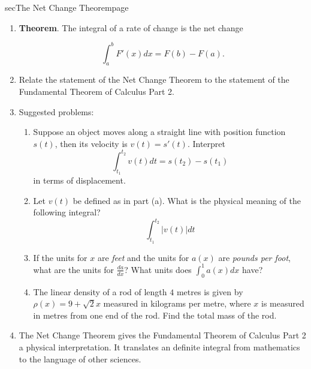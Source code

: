 \documentclass[../main]{subfiles}
\begin{document}
\begin{outline}{sec}{The Net Change Theorem}{page} \label{outline:net_change}
  \begin{enumerate}
    \item \textbf{Theorem}. The integral of a rate of change is the net change
      \begin{mdframed}[style=simple]
        \[ \int_{a}^{b} F'(x) dx = F(b) - F(a). \]
      \end{mdframed}
      
    \item Relate the statement of the Net Change Theorem to the statement of the Fundamental Theorem of Calculus Part 2.
    \item Suggested problems: 
      \begin{enumerate}
        \item Suppose an object moves along a straight line with position function \(s(t)\), then its velocity is \(v(t) = s'(t)\). Interpret 
          \[
            \int_{t_{1}}^{t_{2}} v(t) dt = s(t_{2}) - s(t_{1})
          \]
          in terms of displacement. %

        \item Let \(v(t)\) be defined as in part (a). What is the physical meaning of the following integral?
          \[
            \int_{t_{1}}^{t_{2}} |v(t)| dt
          \]
        \item If the units for \(x\) are \textit{feet} and the units for \(a(x)\) are \textit{pounds per foot}, what are the units for \(\frac{da}{dx}\)? What units does \(\int_{0}^{1} a(x) dx\) have? %
        \item The linear density of a rod of length \(4\) metres is given by \(\rho(x) = 9 + \sqrt{2}x\) measured in kilograms per metre, where \(x\) is measured in metres from one end of the rod. Find the total mass of the rod. %
      \end{enumerate}
      
    \item {The Net Change Theorem gives the Fundamental Theorem of Calculus Part 2 a physical interpretation. It translates an definite integral from mathematics to the language of other sciences.}
\end{enumerate}
\end{outline}
\end{document}

